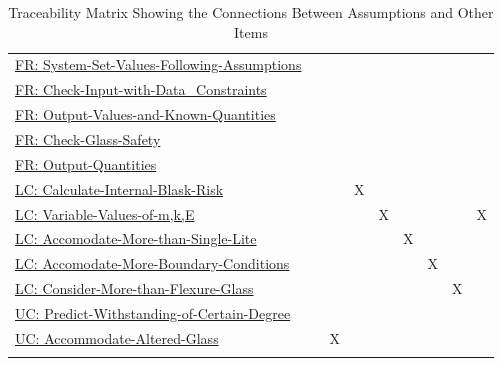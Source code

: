 \documentclass[12pt]{article}
\begin{document}
\begin{longtable}{l l l l l l l l l}
\hyperref[sysSetValsFollowingAssumps]{FR: System-Set-Values-Following-Assumptions} &  &  &  &  &  &  &  & 
\\
\hyperref[checkInputWithDataCons]{FR: Check-Input-with-Data\_Constraints} &  &  &  &  &  &  &  & 
\\
\hyperref[outputValsAndKnownQuants]{FR: Output-Values-and-Known-Quantities} &  &  &  &  &  &  &  & 
\\
\hyperref[checkGlassSafety]{FR: Check-Glass-Safety} &  &  &  &  &  &  &  & 
\\
\hyperref[outputQuants]{FR: Output-Quantities} &  &  &  &  &  &  &  & 
\\
\hyperref[calcInternalBlastRisk]{LC: Calculate-Internal-Blask-Risk} &  &  & X &  &  &  &  & 
\\
\hyperref[varValsOfmkE]{LC: Variable-Values-of-m,k,E} &  &  &  & X &  &  &  & X
\\
\hyperref[accMoreThanSingleLite]{LC: Accomodate-More-than-Single-Lite} &  &  &  &  & X &  &  & 
\\
\hyperref[accMoreBoundaryConditions]{LC: Accomodate-More-Boundary-Conditions} &  &  &  &  &  & X &  & 
\\
\hyperref[considerMoreThanFlexGlass]{LC: Consider-More-than-Flexure-Glass} &  &  &  &  &  &  & X & 
\\
\hyperref[predictWithstandOfCertDeg]{UC: Predict-Withstanding-of-Certain-Degree} &  &  &  &  &  &  &  & 
\\
\hyperref[accAlteredGlass]{UC: Accommodate-Altered-Glass} &  & X &  &  &  &  &  & 
\\
\bottomrule
\caption{Traceability Matrix Showing the Connections Between Assumptions and Other Items}
\label{Table:TraceMatAvsAll}
\end{longtable}
\end{document}
